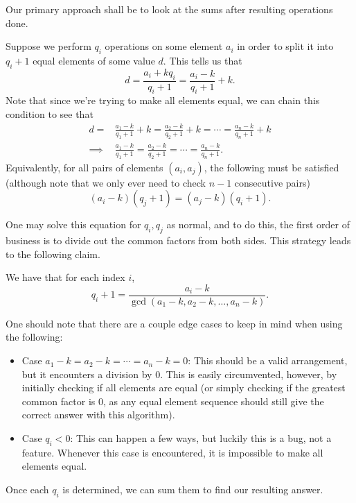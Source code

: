 \documentclass[a4paper, 12pt]{article}
\begin{document}
\begin{solution}
    Our primary approach shall be to look at the sums after resulting operations done.

    \begin{observation}
        Suppose we perform \( q_i \) operations on some element \( a_i \) in order to split it into \( q_i + 1 \) equal elements of some value \( d \). This tells us that
        \[
            d = \frac{a_i + k q_i}{q_i + 1} = \frac{a_i - k}{q_i + 1} + k
        .\]
        Note that since we're trying to make all elements equal, we can chain this condition to see that
        \begin{align*}
            d = &\frac{a_1 - k}{q_1 + 1} + k = \frac{a_2 - k}{q_2 + 1} + k = \cdots = \frac{a_n - k}{q_n + 1} + k \\
            \implies &\frac{a_1 - k}{q_1 + 1} = \frac{a_2 - k}{q_2 + 1} = \cdots = \frac{a_n - k}{q_n + 1} 
        .\end{align*}
        Equivalently, for all pairs of elements \( (a_i, a_j) \), the
        following must be satisfied (although note that we only ever need to check \( n - 1 \) consecutive pairs)
        \[
            (a_i - k) (q_j + 1) = (a_j - k) (q_i + 1)
        .\]
    \end{observation}

    One may solve this equation for \( q_i, q_j \) as normal, and to do this, the first order of business is to divide out the common factors from both sides. This strategy leads to the following claim.
    \begin{claim}
        We have that for each index \( i \),
        \[
            q_i + 1 = \frac{a_i - k}{\gcd(a_1 - k, a_2 - k, \ldots, a_n - k)}
        .\]
    \end{claim}

    One should note that there are a couple edge cases to keep in mind when using the following:
    \begin{itemize}
        \item Case \( a_1 - k = a_2 - k = \cdots = a_n - k = 0 \): This should be a valid arrangement, but it encounters a division by \( 0 \). This is easily circumvented, however, by initially checking if all elements are equal (or simply checking if the greatest common factor is \( 0 \), as any equal element sequence should still give the correct answer with this algorithm).
        \item Case \( q_i < 0 \): This can happen a few ways, but luckily this is a bug, not a feature. Whenever this case is encountered, it is impossible to make all elements equal.
    \end{itemize}
    Once each \( q_i \) is determined, we can sum them to find our resulting answer.


\end{solution}
\end{document}
